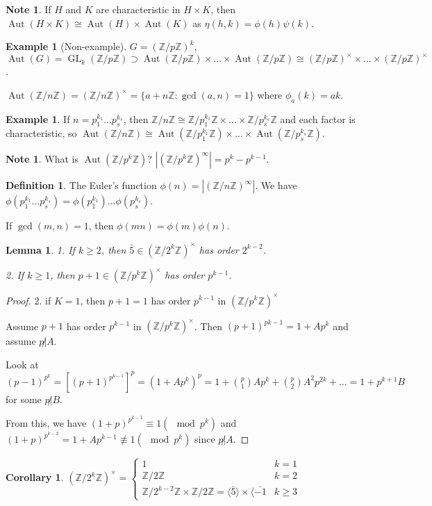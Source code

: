\documentclass{amsart}
\newtheorem{lem}[thm]{Lemma}
\newtheorem{cor}[thm]{Corollary}
\theoremstyle{definition}
\newtheorem{definition}[thm]{Definition}
\newtheorem{example}[thm]{Example}
\newtheorem{note}[thm]{Note}
\newcommand{\Z}{\mathbb Z}
\DeclareMathOperator{\GL}{GL}
\DeclareMathOperator{\Aut}{Aut}
\begin{document}
\begin{note}
If $H$ and $K$ are characteristic in $H\times K$, then $\Aut(H\times K)\cong \Aut (H)\times \Aut(K)$ as $\eta(h,k)=\phi(h)\psi(k)$. 	
\end{note}
\begin{example}[Non-example]
	$G=(\Z/p\Z)^k$, $\Aut(G)=\GL_k(\Z/p\Z)\supset \Aut(\Z/p\Z)\times...\times \Aut(\Z/p\Z) \cong (\Z/p\Z)^\times\times ...\times (\Z/p\Z)^\times$.
\end{example}
$\Aut(\Z/n\Z)=(\Z/n\Z)^\times=\{a+n\Z:\gcd(a,n)=1\}$ where $\phi_a(k)=ak$.
\begin{example}
	If $n=p_1^{k_1}...p_s^{k_s}$, then $\Z/n\Z\cong \Z/p_1^{k_1}\Z\times ...\times \Z/p_s^{k_s}\Z$ and each factor is characteristic, so $\Aut(\Z/n\Z)\cong \Aut(\Z/p_1^{k_1}\Z)\times...\times \Aut(\Z/p_s^{k_s}\Z)$.
\end{example}
\begin{note}
	What is $\Aut(\Z/p^k\Z)$? $|(\Z/p^k\Z)^\infty|=p^k-p^{k-1}$.
\end{note}
\begin{definition}
	The Euler's function $\phi(n)=|(\Z/n\Z)^\infty|$. We have $\phi(p_1^{k_1}...p_s^{k_s})=\phi(p_1^{k_1})...\phi(p_s^{k_s})$.
	
	If $\gcd(m,n)=1$, then $\phi(mn)=\phi(m)\phi(n)$.
\end{definition}
\begin{lem}
	1. If $k\geq 2$, then $\bar{5}\in(\Z/2^k\Z)^\times$ has order $2^{k-2}$.
	
	2. If $k\geq 1$, then $p+1\in (\Z/p^k\Z)^\times $ has order $p^{k-1}$.
\end{lem}
\begin{proof}
	2. if $K=1$, then $p+1=1$ has order $p^{k-1}$ in $(\Z/p^k\Z)^\times$
	
	Assume $p+1$ has order $p^{k-1}$ in $(\Z/p^k\Z)^\times$. Then $(p+1)^{pk-1}=1+Ap^k$ and assume $p\not| A$.
	
	Look at $(p-1)^{p^k}=[(p+1)^{p^{k-1}}]^p=(1+Ap^k)^p=1+\binom{p}{1}Ap^k+\binom{p}{2}A^2p^{2k}+...=1+p^{k+1}B$ for some $p\not|B$.
	
	From this, we have $(1+p)^{p^{k-1}}\equiv 1(\mod p^k)$ and $(1+p)^{p^{k-2}}=1+Ap^{k-1}\not\equiv 1(\mod p^k)$ since $p\not| A$.
\end{proof}
\begin{cor}
$(\Z/2^k\Z)^\times=\begin{cases}
	1&k=1\\\Z/2\Z&k=2\\\Z/2^{k-2}\Z\times\Z/2\Z=\langle \bar 5\rangle\times \langle\bar{-1}&k\geq 3
\end{cases}$	
\end{cor}
\end{document}
